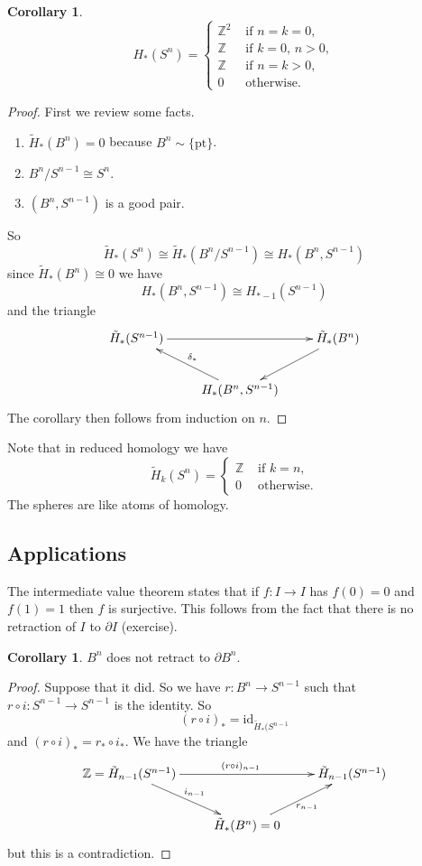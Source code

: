 \documentclass[12pt]{article}
\theoremstyle{definition}
\newtheorem{cor}[thm]{Corollary}
\theoremstyle{definition}
\newcommand{\ZZ}{\mathbb{Z}}
\renewcommand{\H}{H_*}
\begin{document}
\begin{cor}
\[
\H(S^n) =\begin{cases}
\ZZ^2 &\text{ if } n= k =0,\\
\ZZ &\text{ if } k =0,\,n>0,\\
\ZZ &\text{ if } n= k >0,\\
0 &\text{ otherwise}.
\end{cases} 
\]
\end{cor}
\begin{proof}
First we review some facts.
\begin{enumerate}
\item
$\tilde\H(B^n) = 0$ because $B^n \sim \{\text{pt}\}$.
\item $B^n /S^{n-1} \cong S^n$.
\item $(B^n, S^{n-1})$ is a good pair.
\end{enumerate}
So
\[
\tilde\H(S^n) \cong \tilde\H(B^n/S^{n-1}) \cong \H(B^n, S^{n-1})
\]
since $\tilde\H(B^n) \cong 0$ we have
\[
\H(B^n,S^{n-1}) \cong H_{*-1}(S^{n-1})
\]
and the triangle
\[
\xymatrix
{
 \tilde\H(S^{n-1}) \ar[rr]& &\tilde\H(B^n)\ar[dl] \\
 &\H(B^n, S^{n-1}) \ar[ul]_{\delta_*}&
}
\]
The corollary then follows from induction on $n$.
\end{proof}

Note that in reduced homology we have 
\[
\tilde H_k(S^n) =\begin{cases}
\ZZ &\text{ if } k=n,\\
0 &\text{ otherwise}.
\end{cases}
\]
The spheres are like atoms of homology.

\subsection{Applications}
The intermediate value theorem states that if $f\colon I \to I$ has $f(0) = 0$ and $f(1) = 1$ then $f$ is surjective.
This follows from the fact that there is no retraction of $I$ to $\partial I$ (exercise).

\begin{cor}
$B^n$ does not retract to $\partial B^n$.
\end{cor}
\begin{proof}
Suppose that it did.
So we have $r\colon B^n \to S^{n-1}$ such that $r\circ i\colon S^{n-1} \to S^{n-1}$ is the identity.
So \[(r\circ i)_* = \text{id}_{\tilde\H(S^{n-1}}\]
and $(r\circ i)_* = r_* \circ i_*$.
We have the triangle
\[
\xymatrix
{
 \ZZ=\tilde H_{n-1}(S^{n-1})\ar[dr]^{i_{n-1}} \ar[rr]^{(r\circ i)_{n-1}}& &\tilde H_{n-1}(S^{n-1}) \\
 &\tilde\H(B^n)= 0 \ar[ur]_{r_{n-1}}&
}
\]
but this is a contradiction.
\end{proof}
\end{document}
